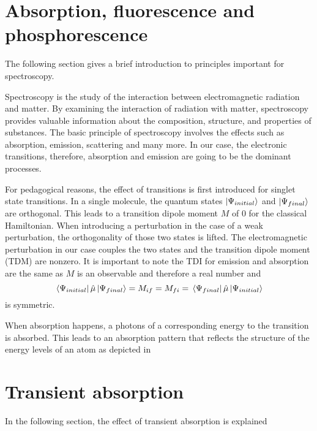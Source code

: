 \section{Absorption, fluorescence and phosphorescence}

The following section gives a brief introduction to principles important for spectroscopy.

Spectroscopy is the study of the interaction between electromagnetic radiation and matter. By examining the interaction of radiation with matter, spectroscopy provides valuable information about the composition, structure, and properties of substances. The basic principle of spectroscopy involves the effects such as absorption, emission, scattering and many more. In our case, the electronic transitions, therefore, absorption and emission are going to be the dominant processes.

For pedagogical reasons, the effect of transitions is first introduced for singlet state transitions. In a single molecule, the quantum states $\ket{\Psi_{initial}}$ and $\ket{\Psi_{final}}$ are orthogonal. This leads to a transition dipole moment $M$ of 0 for the classical Hamiltonian. When introducing a perturbation in the case of a weak perturbation, the orthogonality of those two states is lifted. The electromagnetic perturbation in our case couples the two states and the transition dipole moment (TDM) are nonzero. It is important to note the TDI for emission and absorption are the same as $M$ is an observable and therefore a real number and
\begin{equation}
    \bra*{\Psi_{initial}}\hat\mu\ket*{\Psi_{final}} = M_{if} = M_{fi} = \bra*{\Psi_{final}}\hat\mu\ket*{\Psi_{initial}}
\end{equation}
is symmetric.

When absorption happens, a photons of a corresponding energy to the transition is absorbed. This leads to an 
absorption pattern that reflects the structure of the energy levels of an atom as depicted in 








\section{Transient absorption}
\label{sec:TheoTransAbs}

In the following section, the effect of transient absorption is explained